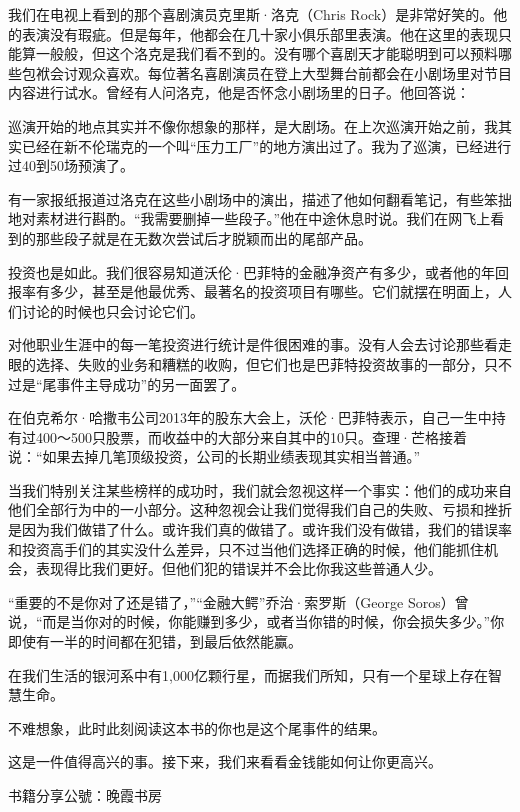 我们在电视上看到的那个喜剧演员克里斯·洛克（Chris Rock）是非常好笑的。他的表演没有瑕疵。但是每年，他都会在几十家小俱乐部里表演。他在这里的表现只能算一般般，但这个洛克是我们看不到的。没有哪个喜剧天才能聪明到可以预料哪些包袱会讨观众喜欢。每位著名喜剧演员在登上大型舞台前都会在小剧场里对节目内容进行试水。曾经有人问洛克，他是否怀念小剧场里的日子。他回答说：

{\kaishu

巡演开始的地点其实并不像你想象的那样，是大剧场。在上次巡演开始之前，我其实已经在新不伦瑞克的一个叫“压力工厂”的地方演出过了。我为了巡演，已经进行过40到50场预演了。

}

有一家报纸报道过洛克在这些小剧场中的演出，描述了他如何翻看笔记，有些笨拙地对素材进行斟酌。“我需要删掉一些段子。”他在中途休息时说。我们在网飞上看到的那些段子就是在无数次尝试后才脱颖而出的尾部产品。

投资也是如此。我们很容易知道沃伦·巴菲特的金融净资产有多少，或者他的年回报率有多少，甚至是他最优秀、最著名的投资项目有哪些。它们就摆在明面上，人们讨论的时候也只会讨论它们。

对他职业生涯中的每一笔投资进行统计是件很困难的事。没有人会去讨论那些看走眼的选择、失败的业务和糟糕的收购，但它们也是巴菲特投资故事的一部分，只不过是“尾事件主导成功”的另一面罢了。

在伯克希尔·哈撒韦公司2013年的股东大会上，沃伦·巴菲特表示，自己一生中持有过400～500只股票，而收益中的大部分来自其中的10只。查理·芒格接着说：“如果去掉几笔顶级投资，公司的长期业绩表现其实相当普通。”

当我们特别关注某些榜样的成功时，我们就会忽视这样一个事实：他们的成功来自他们全部行为中的一小部分。这种忽视会让我们觉得我们自己的失败、亏损和挫折是因为我们做错了什么。或许我们真的做错了。或许我们没有做错，我们的错误率和投资高手们的其实没什么差异，只不过当他们选择正确的时候，他们能抓住机会，表现得比我们更好。但他们犯的错误并不会比你我这些普通人少。

“重要的不是你对了还是错了，”“金融大鳄”乔治·索罗斯（George Soros）曾说，“而是当你对的时候，你能赚到多少，或者当你错的时候，你会损失多少。”你即使有一半的时间都在犯错，到最后依然能赢。

在我们生活的银河系中有1,000亿颗行星，而据我们所知，只有一个星球上存在智慧生命。

不难想象，此时此刻阅读这本书的你也是这个尾事件的结果。

这是一件值得高兴的事。接下来，我们来看看金钱能如何让你更高兴。

书籍分享公號：晚霞书房
